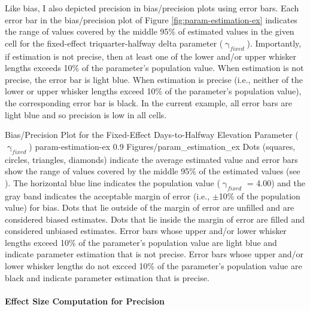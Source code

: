 \documentclass[
12pt, %
twoside,
english]{guelphthesis}
\begin{document}
Like bias, I also depicted precision in bias/precision plots using error bars. Each error bar in the bias/precision plot of Figure \ref{fig:param-estimation-ex} indicates the range of values covered by the middle 95\% of estimated values in the given cell for the fixed-effect triquarter-halfway delta parameter (\(\upgamma_{fixed}\)). Importantly, if estimation is not precise, then at least one of the lower and/or upper whisker lengths exceeds 10\% of the parameter's population value. When estimation is not precise, the error bar is light blue. When estimation is precise (i.e., neither of the lower or upper whisker lengths exceed 10\% of the parameter's population value), the corresponding error bar is black. In the current example, all error bars are light blue and so precision is low in all cells.
\begin{apaFigure}
[portrait]
[0cm]
{Bias/Precision Plot for the Fixed-Effect Days-to-Halfway Elevation Parameter ($\upgamma_{fixed}$)}
{param-estimation-ex}
{0.9}
{Figures/param_estimation_ex}
{Dots (squares, circles, triangles, diamonds) indicate the average estimated value and error bars show the range of values covered by the middle 95\% of the estimated values (see ). The horizontal blue line indicates the population value ($\upgamma_{fixed}$ = 4.00) and the gray band indicates the acceptable margin of error (i.e., $\pm$10\% of the population value) for bias. Dots that lie outside of the margin of error are unfilled and are considered biased estimates. Dots that lie inside the margin of error are filled and considered unbiased estimates. Error bars whose upper and/or lower whisker lengths exceed 10\% of the parameter's population value are light blue and indicate parameter estimation that is not precise. Error bars whose upper and/or lower whisker lengths do not excced 10\% of the parameter's population value are black and indicate parameter estimation that is precise.}
\end{apaFigure}
\hypertarget{effect-size-computation-for-precision}{%
\paragraph{Effect Size Computation for Precision}\label{effect-size-computation-for-precision}}
\end{document}
